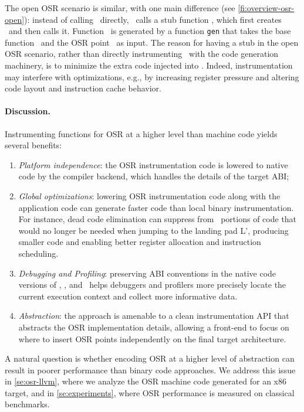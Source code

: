 The open OSR scenario is similar, with one main difference (see \myfigure\ref{fi:overview-osr-open}): instead of calling \fosrto\ directly, \fosrfrom\ calls a stub function \fstub, which first creates \fosrto\ and then calls it. Function \fosrto\ is generated by a function {\tt gen} that takes the base function \fbase\ and the OSR point \osrpoint\ as input. The reason for having a stub in the open OSR scenario, rather than directly instrumenting \fbase\ with the code generation machinery, is to minimize the extra code injected into \fbase. Indeed, instrumentation may interfere with optimizations, e.g., by increasing register pressure and altering code layout and instruction cache behavior.


\paragraph{Discussion.}
Instrumenting functions for OSR at a higher level than machine code yields several benefits: 
\begin{enumerate}
\item {\em Platform independence}: the OSR instrumentation code is lowered to native code by the compiler backend, which handles the details of the target ABI; 
\item {\em Global optimizations}: lowering OSR instrumentation code along with the application code can generate faster code than local binary instrumentation. For instance, dead code elimination can suppress from \fosrto\ portions of code that would no longer be needed when jumping to the landing pad \textsf{L'}, producing smaller code and enabling better register allocation and instruction scheduling.
\item {\em Debugging and Profiling}: preserving ABI conventions in the native code versions of \fosrfrom, \fstub, and \fosrto\ helps debuggers and profilers more precisely locate the current execution context and collect more informative data.
\item {\em Abstraction}: the approach is amenable to a clean instrumentation API that abstracts the OSR implementation details, allowing a front-end to focus on where to insert OSR points independently on the final target architecture.
\end{enumerate}

\noindent A natural question is whether encoding OSR at a higher level of abstraction can result in poorer performance than binary code approaches. We address this issue in \mysection\ref{se:osr-llvm}, where we analyze the OSR machine code generated for an x86 target, and in \mysection\ref{se:experiments}, where OSR performance is measured on classical benchmarks.

